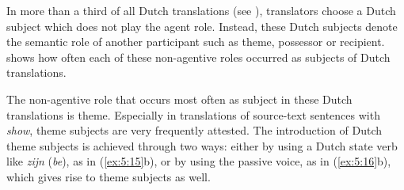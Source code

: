 \documentclass[output=paper]{LSP/langsci}
\begin{document}
In more than a third of all Dutch translations (see ), translators choose a Dutch subject which does not play the agent role. Instead, these Dutch subjects denote the semantic role of another participant such as theme, possessor or recipient.  shows how often each of these non-agentive roles occurred as subjects of Dutch translations.

\begin{table}
     \centering
     \caption{Dutch translations with non-agentive subjects}
     \label{tab:5.4}
\end{table}
  

 
The non-agentive role that occurs most often as subject in these Dutch translations is theme. Especially in translations of source-text sentences with \textit{show}, theme subjects are very frequently attested. The introduction of Dutch theme subjects is achieved through two ways: either by using a Dutch state verb like \textit{zijn} (\textit{be}), as in (\ref{ex:5:15}b), or by using the passive voice, as in (\ref{ex:5:16}b), which gives rise to theme subjects as well.

\end{document}
